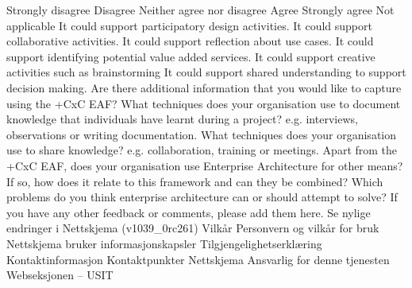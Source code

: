 Strongly disagree
Disagree
Neither agree nor disagree
Agree
Strongly agree
Not applicable
It could support participatory design activities.
It could support collaborative activities.
It could support reflection about use cases.
It could support identifying potential value added services.
It could support creative activities such as brainstorming
It could support shared understanding to support decision making.
Are there additional information that you would like to capture using the +CxC EAF?
What techniques does your organisation use to document knowledge that individuals have learnt during a project? e.g. interviews, observations or writing documentation.
What techniques does your organisation use to share knowledge? e.g. collaboration, training or meetings.
Apart from the +CxC EAF, does your organisation use Enterprise Architecture for other means? If so, how does it relate to this framework and can they be combined?
Which problems do you think enterprise architecture can or should attempt to solve?
If you have any other feedback or comments, please add them here.
Se nylige endringer i Nettskjema (v1039_0rc261)
Vilkår Personvern og vilkår for bruk Nettskjema bruker informasjonskapsler Tilgjengelighetserklæring
Kontaktinformasjon Kontaktpunkter Nettskjema
Ansvarlig for denne tjenesten Webseksjonen – USIT
